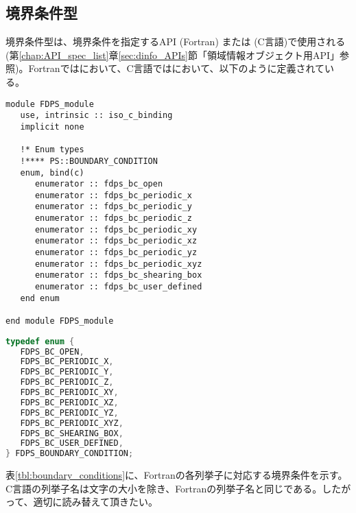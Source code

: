 \subsection{境界条件型}
\label{subsec:enum_bc}
境界条件型は、境界条件を指定するAPI  (Fortran) または  (C言語)で使用される(第\ref{chap:API_spec_list}章\ref{sec:dinfo_APIs}節「領域情報オブジェクト用API」参照)。Fortranではにおいて、C言語ではにおいて、以下のように定義されている。

\begin{lstlisting}[caption=境界条件型 (Fortran)]
module FDPS_module
   use, intrinsic :: iso_c_binding
   implicit none
   
   !* Enum types
   !**** PS::BOUNDARY_CONDITION
   enum, bind(c)
      enumerator :: fdps_bc_open
      enumerator :: fdps_bc_periodic_x
      enumerator :: fdps_bc_periodic_y
      enumerator :: fdps_bc_periodic_z
      enumerator :: fdps_bc_periodic_xy
      enumerator :: fdps_bc_periodic_xz
      enumerator :: fdps_bc_periodic_yz
      enumerator :: fdps_bc_periodic_xyz
      enumerator :: fdps_bc_shearing_box
      enumerator :: fdps_bc_user_defined
   end enum
   
end module FDPS_module
\end{lstlisting}

\begin{lstlisting}[language=C,caption=境界条件型 (C言語)]
typedef enum {
   FDPS_BC_OPEN,
   FDPS_BC_PERIODIC_X,
   FDPS_BC_PERIODIC_Y,
   FDPS_BC_PERIODIC_Z,
   FDPS_BC_PERIODIC_XY,
   FDPS_BC_PERIODIC_XZ,
   FDPS_BC_PERIODIC_YZ,
   FDPS_BC_PERIODIC_XYZ,
   FDPS_BC_SHEARING_BOX,
   FDPS_BC_USER_DEFINED,
} FDPS_BOUNDARY_CONDITION;
\end{lstlisting}

表\ref{tbl:boundary_conditions}に、Fortranの各列挙子に対応する境界条件を示す。C言語の列挙子名は文字の大小を除き、Fortranの列挙子名と同じである。したがって、適切に読み替えて頂きたい。

